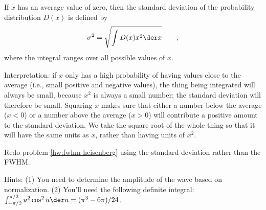 If $x$ has an average value of zero, then
the standard deviation of the probability distribution $D(x)$ is defined by
\begin{equation*}
  \sigma^2 = \sqrt{\int D(x)x^2 \der x} \qquad ,
\end{equation*}
where the integral ranges over all possible values of $x$.

Interpretation: if $x$ only has a high probability of having values close to the average
(i.e., small positive and negative values), the thing being integrated will always
be small, because $x^2$ is always a small number; the standard deviation will therefore
be small. Squaring $x$ makes sure that either a number below the average ($x<0$) or a number above
the average ($x>0$) will contribute a positive amount to the standard deviation. We take
the square root of the whole thing so that it will have the same units as $x$, rather
than having units of $x^2$.

Redo problem \ref{hw:fwhm-heisenberg} using the standard deviation rather than
the FWHM.

Hints: (1) You need to determine the amplitude of the wave based on normalization.
(2) You'll need the following definite integral:
$\int_{-\pi/2}^{\pi/2} u^2 \cos^2 u \der u = (\pi^3-6\pi)/24$.
\answercheck
